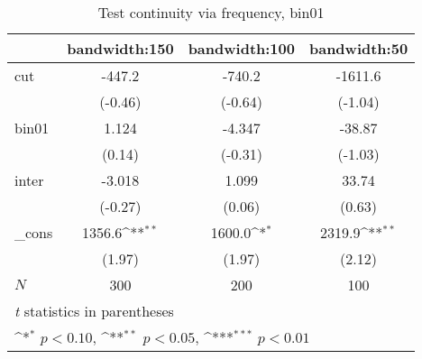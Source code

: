\begin{table}[htbp]\centering
\def\sym#1{\ifmmode^{#1}\else\(^{#1}\)\fi}
\caption{Test continuity via frequency, bin01}
\begin{tabular}{l*{3}{c}}
\hline\hline
            &\multicolumn{1}{c}{bandwidth:150}&\multicolumn{1}{c}{bandwidth:100}&\multicolumn{1}{c}{bandwidth:50}\\
\hline
cut         &      -447.2         &      -740.2         &     -1611.6         \\
            &     (-0.46)         &     (-0.64)         &     (-1.04)         \\
[1em]
bin01       &       1.124         &      -4.347         &      -38.87         \\
            &      (0.14)         &     (-0.31)         &     (-1.03)         \\
[1em]
inter       &      -3.018         &       1.099         &       33.74         \\
            &     (-0.27)         &      (0.06)         &      (0.63)         \\
[1em]
\_cons      &      1356.6\sym{**} &      1600.0\sym{*}  &      2319.9\sym{**} \\
            &      (1.97)         &      (1.97)         &      (2.12)         \\
\hline
\(N\)       &         300         &         200         &         100         \\
\hline\hline
\multicolumn{4}{l}{\footnotesize \textit{t} statistics in parentheses}\\
\multicolumn{4}{l}{\footnotesize \sym{*} \(p<0.10\), \sym{**} \(p<0.05\), \sym{***} \(p<0.01\)}\\
\end{tabular}
\end{table}
